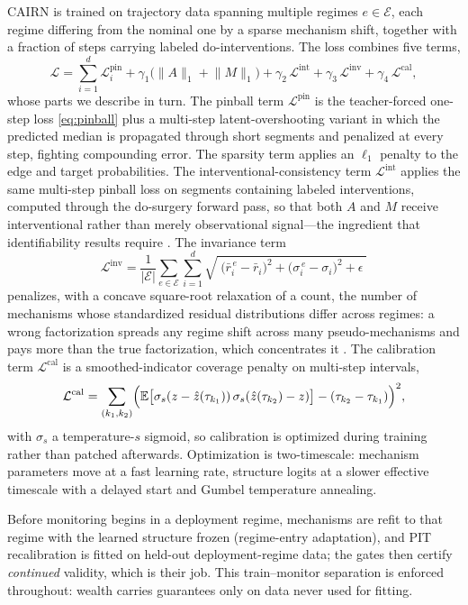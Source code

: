 \documentclass[preprint,12pt]{elsarticle}
\theoremstyle{definition}
\theoremstyle{remark}
\newcommand{\E}{\mathbb{E}}
\newcommand{\Lpin}{\mathcal{L}^{\mathrm{pin}}}
\newcommand{\Lint}{\mathcal{L}^{\mathrm{int}}}
\newcommand{\Linv}{\mathcal{L}^{\mathrm{inv}}}
\newcommand{\Lcal}{\mathcal{L}^{\mathrm{cal}}}
\begin{document}
CAIRN is trained on trajectory data spanning multiple regimes
$e\in\mathcal{E}$, each regime differing from the nominal one by a sparse
mechanism shift, together with a fraction of steps carrying labeled
do-interventions. The loss combines five terms,
\begin{equation}\label{eq:loss}
\mathcal{L}
=\sum_{i=1}^d \Lpin_i
+\gamma_1\bigl(\lVert A\rVert_1+\lVert M\rVert_1\bigr)
+\gamma_2\,\Lint
+\gamma_3\,\Linv
+\gamma_4\,\Lcal ,
\end{equation}
whose parts we describe in turn. The pinball term $\Lpin$ is the
teacher-forced one-step loss \eqref{eq:pinball} plus a multi-step
latent-overshooting variant in which the predicted median is propagated
through short segments and penalized at every step, fighting compounding
error. The sparsity term applies an $\ell_1$ penalty to the edge and
target probabilities. The interventional-consistency term $\Lint$ applies
the same multi-step pinball loss on segments containing labeled
interventions, computed through the do-surgery forward pass, so that both
$A$ and $M$ receive interventional rather than merely observational
signal---the ingredient that identifiability results require
\citep{ahuja2023interventional}. The invariance term
\begin{equation}\label{eq:inv}
\Linv=\frac{1}{\lvert\mathcal{E}\rvert}\sum_{e\in\mathcal{E}}
\sum_{i=1}^d\sqrt{\;\bigl(\bar r_i^{\,e}-\bar r_i\bigr)^2
+\bigl(\sigma_i^{\,e}-\sigma_i\bigr)^2+\epsilon\;}
\end{equation}
penalizes, with a concave square-root relaxation of a count, the number
of mechanisms whose standardized residual distributions differ across
regimes: a wrong factorization spreads any regime shift across many
pseudo-mechanisms and pays more than the true factorization, which
concentrates it \citep{scholkopf2021toward}. The calibration term $\Lcal$
is a smoothed-indicator coverage penalty on multi-step intervals,
\begin{equation}\label{eq:cal}
\Lcal=\sum_{(k_1,k_2)}\Bigl(\E\bigl[\sigma_s(z-\hat z(\tau_{k_1}))\,
\sigma_s(\hat z(\tau_{k_2})-z)\bigr]-(\tau_{k_2}-\tau_{k_1})\Bigr)^2,
\end{equation}
with $\sigma_s$ a temperature-$s$ sigmoid, so calibration is optimized
during training rather than patched afterwards. Optimization is
two-timescale: mechanism parameters move at a fast learning rate,
structure logits at a slower effective timescale with a delayed start and
Gumbel temperature annealing.

Before monitoring begins in a deployment regime, mechanisms are refit to
that regime with the learned structure frozen (regime-entry adaptation),
and PIT recalibration is fitted on held-out deployment-regime data; the
gates then certify \emph{continued} validity, which is their job. This
train--monitor separation is enforced throughout: wealth carries
guarantees only on data never used for fitting.
\end{document}
